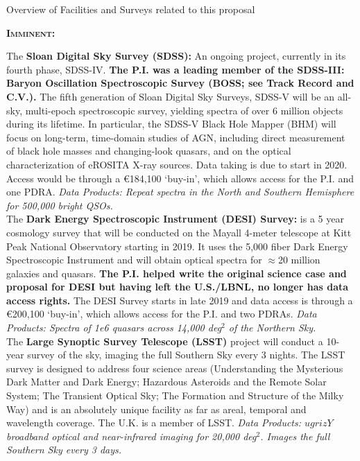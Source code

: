 \begin{framed}
 \begin{tcolorbox}
   \begin{center} 
     Overview of Facilities and Surveys related to this proposal
   \end{center}
 \end{tcolorbox}
  
\noindent
\textbf{\textsc{Imminent:}}

The {\bf Sloan Digital Sky Survey (SDSS):} An ongoing project,
currently in its fourth phase, SDSS-IV.  {\bf The P.I. was a leading
member of the SDSS-III: Baryon Oscillation Spectroscopic Survey (BOSS;
see Track Record and C.V.).} The fifth generation of Sloan Digital Sky
Surveys, SDSS-V will be an all-sky, multi-epoch spectroscopic survey,
yielding spectra of over 6 million objects during its lifetime. In
particular, the SDSS-V Black Hole Mapper (BHM) will focus on
long-term, time-domain studies of AGN, including direct measurement of
black hole masses and changing-look quasars, and on the optical
characterization of eROSITA X-ray sources. Data taking is due to start
in 2020. Access would be through a \euro184,100 `buy-in', which allows
access for the P.I. and one PDRA.  {\it Data Products: Repeat spectra
in the North and Southern Hemisphere for 500,000 bright QSOs.} \\

The {\bf Dark Energy Spectroscopic Instrument (DESI) Survey:} is a 5
year cosmology survey that will be conducted on the Mayall 4-meter
telescope at Kitt Peak National Observatory starting in 2019. It uses
the 5,000 fiber Dark Energy Spectroscopic Instrument and will obtain
optical spectra for $\approx$20 million galaxies and quasars.  {\bf
The P.I. helped write the original science case and proposal for DESI
\citep{Schlegel2011} but having left the U.S./LBNL, no longer has data
access rights.}  The DESI Survey starts in late 2019 and data access
is through a \euro200,100 `buy-in', which allows access for the
P.I. and two PDRAs.  {\it Data Products: Spectra of 1e6 quasars across
14,000 deg$^{2}$ of the Northern Sky.} \\

The {\bf Large Synoptic Survey Telescope (LSST)} project will conduct
a 10-year survey of the sky, imaging the full Southern Sky every 3
nights. The LSST survey is designed to address four science areas
(Understanding the Mysterious Dark Matter and Dark Energy; Hazardous
Asteroids and the Remote Solar System; The Transient Optical Sky; The
Formation and Structure of the Milky Way) and is an absolutely unique
facility as far as areal, temporal and wavelength coverage. The U.K.
is a member of LSST.  {\it Data Products: $ugrizY$ broadband optical
and near-infrared imaging for 20,000 deg$^2$.  Images the full
Southern Sky every 3 days.} \\


\end{framed}
